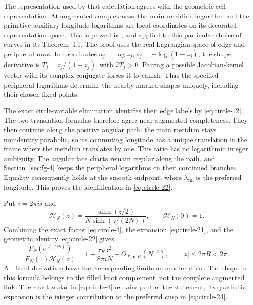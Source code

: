 The representation used by that calculation agrees with the geometric
cell representation. At augmented completeness, the main meridian
logarithm and the primitive auxiliary longitude logarithms are local
coordinates on its decorated representation space. This is proved in
\cite[Proposition~6.1]{NonparabolicTreeGeometry},
and applied to this particular choice of curves in its Theorem~1.1.
The proof uses the real Lagrangian space of edge and peripheral rows.
In coordinates \(u_j=\log z_j\),
\(v_j=-\log(1-z_j)\), the shape derivative is
\(T_j=z_j/(1-z_j)\), with \(\Im T_j>0\). Pairing a possible
Jacobian-kernel vector with its complex conjugate forces it to vanish.
Thus the specified peripheral logarithms determine the nearby marked
shapes uniquely, including their chosen fixed points.

The exact circle-variable elimination identifies their edge labels by
\eqref{eq:circle-12}. The two translation formulas therefore agree
near augmented completeness. They then continue along the positive
angular path: the main meridian stays nonidentity parabolic, so its
commuting longitude has a unique translation in the frame where the
meridian translates by one. This ratio has no logarithmic integer
ambiguity. The angular face charts remain regular along the path, and
Section~\ref{sec:fg-4} keeps the peripheral logarithms on their
continued branches. Equality consequently holds at the smooth
endpoint, where \(\lambda_{\mathrm{fill}}\) is the preferred
longitude. This proves the identification in \eqref{eq:circle-22}.

Put \(z=2\pi i s\) and \begin{equation}
 \mathcal H_N(z)=\frac{\sinh(z/2)}{N\sinh(z/(2N))},
                         \qquad\mathcal H_N(0)=1.
 \label{eq:circle-23}
\end{equation} Combining the exact factor \eqref{eq:circle-4}, the expansion \eqref{eq:circle-21}, and the geometric
identity \eqref{eq:circle-22} gives \begin{equation}
 \frac{F_N(e^{z/(2N)})}{F_N(1)\mathcal H_N(z)}
   =1+\frac{\tau_K z^2}{8\pi iN}
                         +O_{\mathcal T,\mathbf n,R}(N^{-2}),
                         \qquad |z|\le2\pi R<2\pi.
 \label{eq:circle-24}
\end{equation} All fixed derivatives have the corresponding limits on smaller disks.
The shape in this formula belongs to the filled knot complement, not the
complete augmented link. The exact scalar in \eqref{eq:circle-4} remains part of the
statement; its quadratic expansion is the integer contribution to the
preferred cusp in \eqref{eq:circle-24}.
